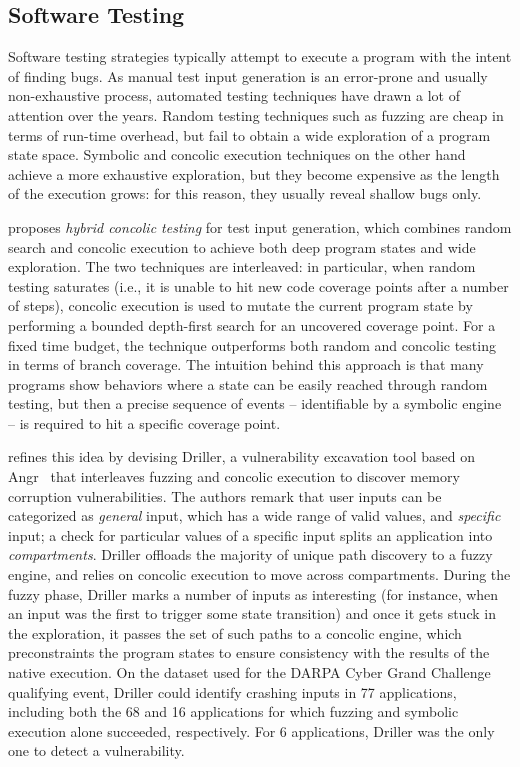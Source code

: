 \subsection{Software Testing}%
\label{ss:bug-detection}

Software testing strategies typically attempt to execute a program with the intent of finding bugs. As manual test input generation is an error-prone and usually non-exhaustive process, automated testing techniques have drawn a lot of attention over the years. Random testing techniques such as fuzzing are cheap in terms of run-time overhead, but fail to obtain a wide exploration of a program state space. Symbolic and concolic execution techniques on the other hand achieve a more exhaustive exploration, but they become expensive as the length of the execution grows: for this reason, they usually reveal shallow bugs only.

\cite{RK-ICSE07} proposes {\em hybrid concolic testing} for test input generation, which combines random search and concolic execution to achieve both deep program states and wide exploration. The two techniques are interleaved: in particular, when random testing saturates (i.e., it is unable to hit new code coverage points after a number of steps), concolic execution is used to mutate the current program state by performing a bounded depth-first search for an uncovered coverage point. For a fixed time budget, the technique outperforms both random and concolic testing in terms of branch coverage. The intuition behind this approach is that many programs show behaviors where a state can be easily reached through random testing, but then a precise sequence of events -- identifiable by a symbolic engine -- is required to hit a specific coverage point.

\cite{DRILLER-NDSS16} refines this idea by devising Driller, a vulnerability excavation tool based on {\sc Angr}~\cite{ANGR-SSP16} that interleaves fuzzing and concolic execution to discover memory corruption vulnerabilities. The authors remark that user inputs can be categorized as {\em general} input, which has a wide range of valid values, and {\em specific} input; a check for particular values of a specific input splits an application into {\em compartments}. Driller offloads the majority of unique path discovery to a fuzzy engine, and relies on concolic execution to move across compartments. During the fuzzy phase, Driller marks a number of inputs as interesting (for instance, when an input was the first to trigger some state transition) and once it gets stuck in the exploration, it passes the set of such paths to a concolic engine, which preconstraints the program states to ensure consistency with the results of the native execution. On the dataset used for the DARPA Cyber Grand Challenge qualifying event, Driller could identify crashing inputs in 77 applications, including both the 68 and 16 applications for which fuzzing and symbolic execution alone succeeded, respectively. For 6 applications, Driller was the only one to detect a vulnerability.

